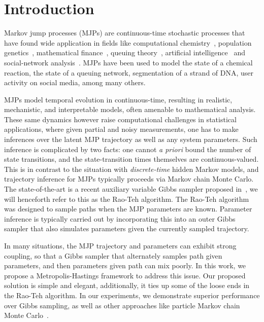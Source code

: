 \section{Introduction}
\label{sec:intro}
Markov jump processes (MJPs) are continuous-time stochastic processes that
have found wide application in fields like computational chemistry~\cite{gillespie97}, 
population genetics~\cite{FearnSher2006}, mathematical finance~\cite{Elliott06}, 
queuing theory~\cite{Breuer2003}, artificial intelligence~\cite{XuShe10} and
social-network analysis~\cite{pan2016markov}. %
MJPs have been used to model the state of a chemical reaction, the state 
of a queuing network, segmentation of a strand of DNA, user activity on social 
media, among many others.

MJPs model temporal evolution in continuous-time, resulting in 
realistic, mechanistic, and interpretable models, often amenable to 
mathematical analysis. These same dynamics however raise computational
challenges in statistical applications, where given partial and noisy 
measurements, one has to make inferences over the latent MJP 
trajectory as well as any system parameters. Such
inference is complicated by two facts: one cannot {\em a priori} 
bound the number of state transitions, and the state-transition times themselves
are continuous-valued. This is in contrast to the situation with
{\em discrete-time} hidden Markov models, and trajectory inference for 
MJPs typically proceeds via Markov chain Monte Carlo. The 
state-of-the-art is a recent auxiliary variable Gibbs sampler proposed 
in~\cite{RaoTeh13}, we will henceforth refer to this as the Rao-Teh algorithm.
The Rao-Teh algorithm was designed to sample paths when the MJP parameters
are known. Parameter inference is typically carried out by 
incorporating this into an outer Gibbs sampler that also simulates
parameters given the currently sampled trajectory. 

In many situations, the MJP trajectory and parameters can exhibit 
strong coupling, so that a Gibbs sampler that alternately samples path given
parameters, and then parameters given path can mix poorly.  
In this work, we propose a Metropolis-Hastings framework to address
this issue. Our proposed solution is simple and elegant, additionally,
it ties up some of the loose ends in the Rao-Teh algorithm.
In our experiments, we demonstrate superior 
performance over Gibbs sampling, as well as other approaches like 
particle Markov chain Monte Carlo~\cite{Andrieu10}.

